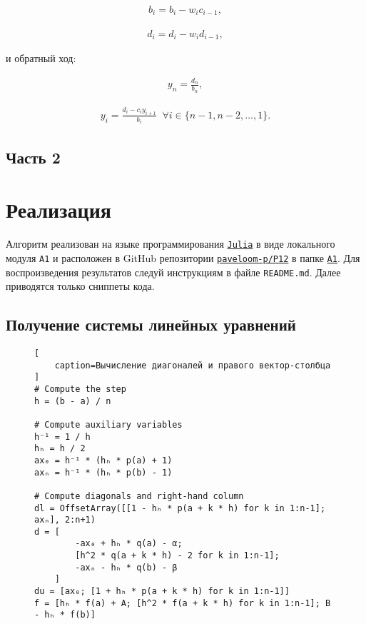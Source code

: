 \begin{gather}
    b_i = b_i - w_i c_{i-1},
\end{gather}

\begin{gather}
    d_i = d_i - w_i d_{i-1},
\end{gather}

и обратный ход:

\hs
\begin{gather}
    y_n = \frac{d_n}{b_n},
\end{gather}

\begin{gather}
    y_i = \frac{d_i - c_i y_{i+1}}{b_i} \;\; \forall i \in \{n-1, n-2, \dots, 1\}.
\end{gather}

\newpage

\subsection*{Часть 2}
\section*{Реализация}

\vspace{18pt}

Алгоритм реализован на языке программирования
\href{https://julialang.org}{\footnotesize \texttt{Julia}} в виде локального модуля {\footnotesize \texttt{A1}}
и расположен в GitHub репозитории \href{https://github.com/paveloom-p/P12}{\footnotesize \texttt{paveloom-p/P12}}
в папке \href{https://github.com/paveloom-p/P12/tree/master/A1}{\footnotesize \texttt{A1}}.
Для воспроизведения результатов следуй инструкциям в файле {\footnotesize \texttt{README.md}}.
Далее приводятся только сниппеты кода.

\subsection{Получение системы линейных уравнений}

\begin{figure}[H]
\begin{lstlisting}[
    caption=Вычисление диагоналей и правого вектор-столбца
]
# Compute the step
h = (b - a) / n

# Compute auxiliary variables
h⁻¹ = 1 / h
hₕ = h / 2
ax₀ = h⁻¹ * (hₕ * p(a) + 1)
axₙ = h⁻¹ * (hₕ * p(b) - 1)

# Compute diagonals and right-hand column
dl = OffsetArray([[1 - hₕ * p(a + k * h) for k in 1:n-1]; axₙ], 2:n+1)
d = [
        -ax₀ + hₕ * q(a) - α;
        [h^2 * q(a + k * h) - 2 for k in 1:n-1];
        -axₙ - hₕ * q(b) - β
    ]
du = [ax₀; [1 + hₕ * p(a + k * h) for k in 1:n-1]]
f = [hₕ * f(a) + A; [h^2 * f(a + k * h) for k in 1:n-1]; B - hₕ * f(b)]
\end{lstlisting}
\end{figure}


